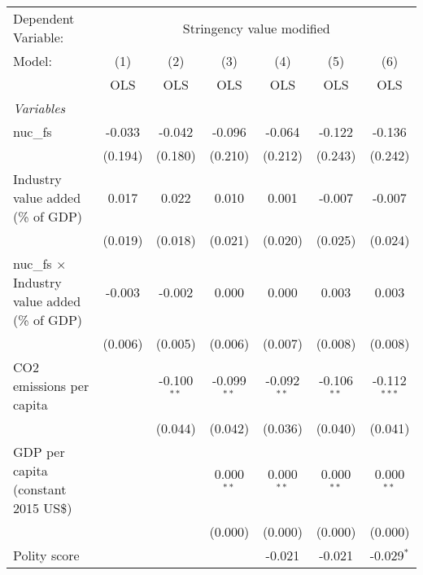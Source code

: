
\begingroup
\centering
\begin{tabular}{lcccccc}
   \toprule
   Dependent Variable: & \multicolumn{6}{c}{Stringency value modified}\\
   Model:                                               & (1)     & (2)           & (3)           & (4)           & (5)           & (6)\\  
                                                        &  OLS    & OLS           & OLS           & OLS           & OLS           & OLS\\  
   \midrule
   \emph{Variables}\\
   nuc\_fs                                              & -0.033  & -0.042        & -0.096        & -0.064        & -0.122        & -0.136\\   
                                                        & (0.194) & (0.180)       & (0.210)       & (0.212)       & (0.243)       & (0.242)\\   
   Industry value added (\% of GDP)                     & 0.017   & 0.022         & 0.010         & 0.001         & -0.007        & -0.007\\   
                                                        & (0.019) & (0.018)       & (0.021)       & (0.020)       & (0.025)       & (0.024)\\   
   nuc\_fs $\times$ Industry value added (\% of GDP)    & -0.003  & -0.002        & 0.000         & 0.000         & 0.003         & 0.003\\   
                                                        & (0.006) & (0.005)       & (0.006)       & (0.007)       & (0.008)       & (0.008)\\   
   CO2 emissions per capita                             &         & -0.100$^{**}$ & -0.099$^{**}$ & -0.092$^{**}$ & -0.106$^{**}$ & -0.112$^{***}$\\   
                                                        &         & (0.044)       & (0.042)       & (0.036)       & (0.040)       & (0.041)\\   
   GDP per capita (constant 2015 US\$)                  &         &               & 0.000$^{**}$  & 0.000$^{**}$  & 0.000$^{**}$  & 0.000$^{**}$\\   
                                                        &         &               & (0.000)       & (0.000)       & (0.000)       & (0.000)\\   
   Polity score                                         &         &               &               & -0.021        & -0.021        & -0.029$^{*}$\\   

\end{tabular}
